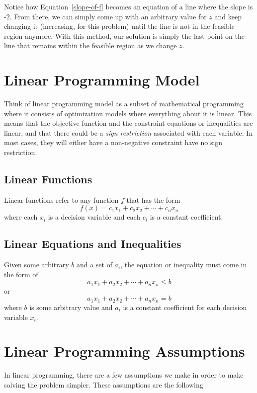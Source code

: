 Notice how Equation~\ref{slope-of-f} becomes an equation of a line where the slope
is -2. From there, we can simply come up with an arbitrary value for $z$ and keep
changing it (increasing, for this problem) until the line is not in the feasible region 
anymore. With this method, our solution is simply the last point on the line that 
remains within the feasible region as we change $z$.

\section{Linear Programming Model}

Think of linear programming model as a subset of mathematical programming where it 
consists of optimization models where everything about it is linear. This means that
the objective function and the constraint equations or inequalities are linear, and 
that there could be a \textit{sign restriction} associated with each variable. In
most cases, they will either have a non-negative constraint have no sign restriction.

\subsection*{Linear Functions}

Linear functions refer to any function $f$ that has the form 
\[ f(x) = c_1x_1 + c_2x_2 + \cdots + c_n x_n \]
where each $x_i$ is a decision variable and each $c_i$ is a constant coefficient.

\subsection*{Linear Equations and Inequalities}

Given some arbitrary $b$ and a set of $a_i$, the equation or inequality must
come in the form of
\[ a_1x_1 + a_2x_2 + \cdots + a_n x_n \leq b \]
or
\[ a_1x_1 + a_2x_2 + \cdots + a_n x_n = b \]
where $b$ is some arbitrary value and $a_i$ is a constant coefficient for each
decision variable $x_i$.

\section{Linear Programming Assumptions}

In linear programming, there are a few assumptions we make in order to make solving
the problem simpler. These assumptions are the following

